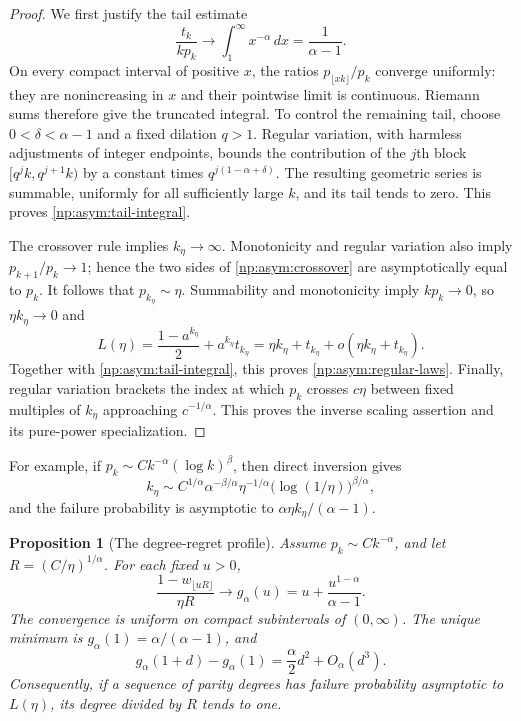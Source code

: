 \documentclass[11pt,a4paper]{article}
\newtheorem{proposition}[theorem]{Proposition}
\theoremstyle{definition}
\theoremstyle{remark}
\begin{document}
\begin{proof}
We first justify the tail estimate
\begin{equation}
 \frac{t_k}{kp_k}\longrightarrow\int_1^\infty x^{-\alpha}\,dx
                  =\frac1{\alpha-1}.
 \label{np:asym:tail-integral}
\end{equation}
On every compact interval of positive $x$, the ratios
$p_{\lfloor xk\rfloor}/p_k$ converge uniformly: they are nonincreasing
in $x$ and their pointwise limit is continuous.  Riemann sums therefore
give the truncated integral.  To control the remaining tail, choose
$0<\delta<\alpha-1$ and a fixed dilation $q>1$.
Regular variation, with harmless adjustments of integer endpoints,
bounds the contribution of the $j$th block
$[q^jk,q^{j+1}k)$ by a constant times
$q^{j(1-\alpha+\delta)}$.  The resulting geometric series is summable,
uniformly for all sufficiently large $k$, and its tail tends to zero.
This proves \eqref{np:asym:tail-integral}.

The crossover rule implies $k_\eta\to\infty$.
Monotonicity and regular variation also imply
$p_{k+1}/p_k\to1$; hence the two sides of
\eqref{np:asym:crossover} are asymptotically equal to $p_k$.
It follows that $p_{k_\eta}\sim\eta$.
Summability and monotonicity imply $kp_k\to0$, so
$\eta k_\eta\to0$ and
\[
 L(\eta)=\frac{1-a^{k_\eta}}2+a^{k_\eta}t_{k_\eta}
        =\eta k_\eta+t_{k_\eta}
                      +o(\eta k_\eta+t_{k_\eta}).
\]
Together with \eqref{np:asym:tail-integral}, this proves
\eqref{np:asym:regular-laws}.
Finally, regular variation brackets the index at which $p_k$ crosses
$c\eta$ between fixed multiples of $k_\eta$ approaching
$c^{-1/\alpha}$.  This proves the inverse scaling assertion and its
pure-power specialization.
\end{proof}

For example, if
$p_k\sim Ck^{-\alpha}(\log k)^\beta$, then direct inversion gives
\[
 k_\eta\sim C^{1/\alpha}\alpha^{-\beta/\alpha}
       \eta^{-1/\alpha}\bigl(\log(1/\eta)\bigr)^{\beta/\alpha},
\]
and the failure probability is asymptotic to
$\alpha\eta k_\eta/(\alpha-1)$.

\begin{proposition}[The degree-regret profile]
\label{np:asym:regret}
Assume $p_k\sim Ck^{-\alpha}$, and let
$R=(C/\eta)^{1/\alpha}$.  For each fixed $u>0$,
\begin{equation}
 \frac{1-w_{\lfloor uR\rfloor}}{\eta R}
 \longrightarrow
 g_\alpha(u)=u+\frac{u^{1-\alpha}}{\alpha-1}.
 \label{np:asym:regret-profile}
\end{equation}
The convergence is uniform on compact subintervals of $(0,\infty)$.
The unique minimum is $g_\alpha(1)=\alpha/(\alpha-1)$, and
\[
 g_\alpha(1+d)-g_\alpha(1)=\frac\alpha2d^2+O_\alpha(d^3).
\]
Consequently, if a sequence of parity degrees has failure probability
asymptotic to $L(\eta)$, its degree divided by $R$ tends to one.
\end{proposition}
\end{document}
